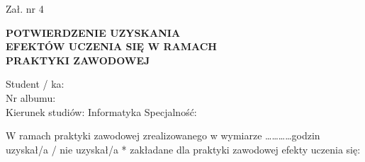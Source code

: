 \documentclass[11pt,a4paper]{article}
\begin{document}
\begin{flushright}
Zał. nr 4
\end{flushright}

\vspace{-1em}
\begin{center}
\textbf{\large POTWIERDZENIE UZYSKANIA} \\[0.5em]
\textbf{\large EFEKTÓW UCZENIA SIĘ W RAMACH} \\[0.5em]
\textbf{\large PRAKTYKI ZAWODOWEJ}
\end{center}

\vspace{1em}

\noindent Student / ka: \dotfill \\
Nr albumu: \dotfill \\
Kierunek studiów: Informatyka \hfill Specjalność: \dotfill \\
\dotfill

\vspace{1em}
\noindent W ramach praktyki zawodowej zrealizowanego w wymiarze \dots\dots\dots\dots godzin uzyskał/a / nie uzyskał/a * zakładane dla praktyki zawodowej efekty uczenia się:

\vspace{1em}
\end{document}
